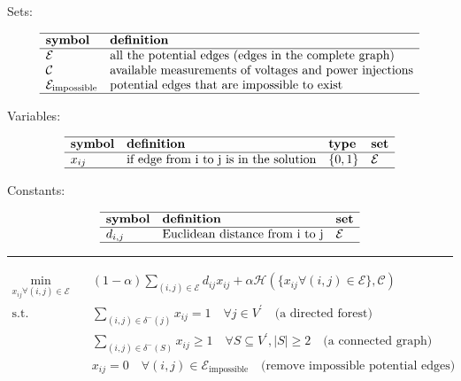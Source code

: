 \documentclass[
]{book}
\begin{document}
Sets:

\[
\begin{array}{ll}
  \hline
  \textbf{symbol} & \textbf{definition} \\
  \hline
  \mathcal{E}
  & \text{all the potential edges (edges in the complete graph)} \\
  \mathcal{C}
  & \text{available measurements of voltages and power injections} \\
  \mathcal{E}_\text{impossible}
  & \text{potential edges that are impossible to exist} \\
  \hline
\end{array}
\]

Variables:

\[
\begin{array}{llll}
  \hline
  \textbf{symbol} & \textbf{definition} & \textbf{type} & \textbf{set} \\
  \hline
  x_{i j} & \text{if edge from i to j is in the solution}
  & \{0, 1\} & \mathcal{E} \\
  \hline
\end{array}
\]

Constants:

\[
\begin{array}{lll}
  \hline
  \textbf{symbol} & \textbf{definition} & \textbf{set} \\
  \hline
  d_{i, j} & \text{Euclidean distance from i to j}
  & \mathcal{E} \\
  \hline
\end{array}
\]

\begin{center}\rule{0.5\linewidth}{0.5pt}\end{center}

\[
\begin{aligned}
  \min_{x_{i j} \forall (i, j) \in \mathcal{E}} \quad
    & (1 - \alpha) \sum_{(i, j) \in \mathcal{E}} d_{i j} x_{i j}
    + \alpha \mathcal{H}
    \left(\{x_{i j} \forall (i, j) \in \mathcal{E} \}, \mathcal{C} \right) \\
  \text{s.t.} \quad & \sum_{(i, j) \in \delta^{-}(j)} x_{i j} = 1
    \quad \forall j \in V^{\prime}
    \quad \text{(a directed forest)} \\
  & \sum_{(i, j) \in \delta^{-}(S)} x_{i j} \geq 1
    \quad \forall S \subseteq V^{\prime},|S| \geq 2
    \quad \text{(a connected graph)} \\
  & x_{i j} = 0
    \quad \forall (i, j) \in \mathcal{E}_\text{impossible}
    \quad \text{(remove impossible potential edges)}
\end{aligned}
\]
\end{document}
